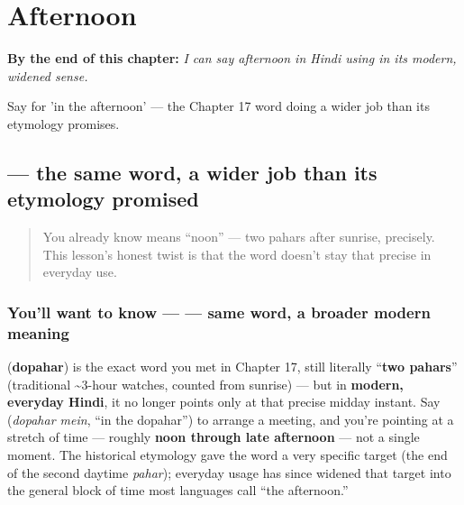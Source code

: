 
\chapter{Afternoon}
\label{ch:hi-afternoon}

\begin{chapteropening}
\textbf{By the end of this chapter:} \emph{I can say afternoon in Hindi using  in its modern, widened sense.}

Say   for 'in the afternoon' — the Chapter 17 word doing a wider job than its etymology promises.
\end{chapteropening}

\section[\texorpdfstring{\hi{दोपहर} (dopahar)}{दोपहर (dopahar)}]{ — the same word, a wider job than its etymology promised}

\label{lesson:HI-C30-dopahar-widened}



\begin{quote}
You already know  means \textquotedblleft{}noon\textquotedblright{} — two pahars after sunrise, precisely. This lesson's honest twist is that the word doesn't stay that precise in everyday use.
\end{quote}

\subsection*{You'll want to know —  — same word, a broader modern meaning}
\textbf{} (\textbf{dopahar}) is the exact word you met in Chapter 17, still literally \textquotedblleft{}\textbf{two pahars}\textquotedblright{} (traditional \textasciitilde{}3-hour watches, counted from sunrise) — but in \textbf{modern, everyday Hindi}, it no longer points only at that precise midday instant. Say \textbf{ } (\emph{dopahar mein}, \textquotedblleft{}in the dopahar\textquotedblright{}) to arrange a meeting, and you're pointing at a stretch of time — roughly \textbf{noon through late afternoon} — not a single moment. The historical etymology gave the word a very specific target (the end of the second daytime \emph{pahar}); everyday usage has since widened that target into the general block of time most languages call \textquotedblleft{}the afternoon.\textquotedblright{}

